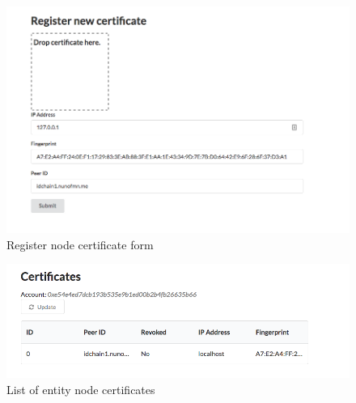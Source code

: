\begin{figure}[h!]
  \centering
  \includegraphics[scale=0.4]{Figures/app-register-certificate.png}
  \caption{Register node certificate form}
\label{fig:register-certificate}
\end{figure}

\begin{figure}[h!]
  \centering
  \includegraphics[scale=0.4]{Figures/app-list-certificates.png}
  \caption{List of entity node certificates}
\label{fig:list-certificates}
\end{figure}

